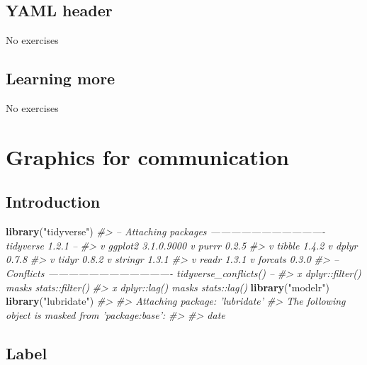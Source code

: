 \documentclass[]{book}
\newenvironment{Shaded}{\begin{snugshade}}{\end{snugshade}}
\newcommand{\CommentTok}[1]{\textcolor[rgb]{0.56,0.35,0.01}{\textit{#1}}}
\newcommand{\KeywordTok}[1]{\textcolor[rgb]{0.13,0.29,0.53}{\textbf{#1}}}
\newcommand{\NormalTok}[1]{#1}
\newcommand{\StringTok}[1]{\textcolor[rgb]{0.31,0.60,0.02}{#1}}
\theoremstyle{plain}
\theoremstyle{remark}
\begin{document}
\hypertarget{yaml-header}{%
\section{YAML header}\label{yaml-header}}

No exercises

\hypertarget{learning-more-1}{%
\section{Learning more}\label{learning-more-1}}

No exercises

\hypertarget{graphics-for-communication}{%
\chapter{Graphics for communication}\label{graphics-for-communication}}

\hypertarget{introduction-18}{%
\section{Introduction}\label{introduction-18}}

\begin{Shaded}
\begin{Highlighting}[]
\KeywordTok{library}\NormalTok{(}\StringTok{"tidyverse"}\NormalTok{)}
\CommentTok{#> -- Attaching packages ---------------------------------- tidyverse 1.2.1 --}
\CommentTok{#> v ggplot2 3.1.0.9000     v purrr   0.2.5     }
\CommentTok{#> v tibble  1.4.2          v dplyr   0.7.8     }
\CommentTok{#> v tidyr   0.8.2          v stringr 1.3.1     }
\CommentTok{#> v readr   1.3.1          v forcats 0.3.0}
\CommentTok{#> -- Conflicts ------------------------------------- tidyverse_conflicts() --}
\CommentTok{#> x dplyr::filter() masks stats::filter()}
\CommentTok{#> x dplyr::lag()    masks stats::lag()}
\KeywordTok{library}\NormalTok{(}\StringTok{"modelr"}\NormalTok{)}
\KeywordTok{library}\NormalTok{(}\StringTok{"lubridate"}\NormalTok{)}
\CommentTok{#> }
\CommentTok{#> Attaching package: 'lubridate'}
\CommentTok{#> The following object is masked from 'package:base':}
\CommentTok{#> }
\CommentTok{#>     date}
\end{Highlighting}
\end{Shaded}

\hypertarget{label}{%
\section{Label}\label{label}}
\end{document}
